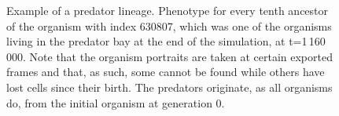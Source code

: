 \begin{figure}
    \begin{center}
    \end{center}
    \caption{
    Example of a predator lineage. Phenotype for every tenth ancestor of the organism with index 630807, which was one of the organisms living in the predator bay at the end of the simulation, at t=1\,160\,000. Note that the organism portraits are taken at certain exported frames and that, as such, some cannot be found while others have lost cells since their birth. The predators originate, as all organisms do, from the initial organism at generation 0.
    }
    \label{fig:predLineage}
\end{figure}


